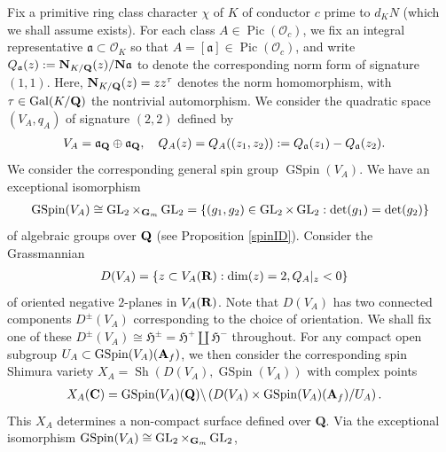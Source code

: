 \documentclass{amsart}
\theoremstyle{definition}
\begin{document}
Fix a primitive ring class character $\chi$ of $K$ of conductor $c$ prime to $d_KN$ (which we shall assume exists).
For each class $A \in \operatorname{Pic}(\mathcal{O}_c)$, we fix an integral representative
$\mathfrak{a} \subset \mathcal{O}_K$ so that $A = [\mathfrak{a}] \in \operatorname{Pic}(\mathcal{O}_c)$,
and write $Q_{\mathfrak{a}}(z) := {\bf{N}}_{K/{\bf{Q}}}(z)/{\bf{N}} \mathfrak{a}$ to denote the corresponding norm form of signature $(1,1)$.
Here, ${\bf{N}}_{K/{\bf{Q}}}(z) = z z^{\tau}$ denotes the norm homomorphism, with $\tau \in \operatorname{Gal}(K/{\bf{Q}})$ the nontrivial automorphism. 
We consider the quadratic space $(V_A, q_A)$ of signature $(2,2)$ defined by
\begin{align*}V_A &= \mathfrak{a}_{\bf{Q}} \oplus \mathfrak{a}_{\bf{Q}}, \quad
Q_A(z) = Q_A((z_1, z_2)) := Q_{\mathfrak{a}}(z_1) - Q_{\mathfrak{a}}(z_2). \end{align*} 
We consider the corresponding general spin group $\operatorname{GSpin}(V_A)$. We have an exceptional isomorphism 
\begin{align*} \operatorname{GSpin}(V_A) \cong \operatorname{GL}_2 \times_{{\bf{G}}_m} \operatorname{GL}_2
= \left\lbrace (g_1, g_2) \in \operatorname{GL}_2 \times \operatorname{GL}_2: \det(g_1) = \det(g_2) \right\rbrace \end{align*}
of algebraic groups over ${\bf{Q}}$ (see Proposition \ref{spinID}). Consider the Grassmannian 
\begin{align*} D(V_A) &= \left\lbrace z \subset V_A({\bf{R}}): \operatorname{dim}(z)=2, Q_A\vert_z <0 \right\rbrace \end{align*}
of oriented negative $2$-planes in $V_A(\bf{R})$. 
Note that $D(V_A)$ has two connected components $D^{\pm}(V_A)$ corresponding to the choice of orientation.
We shall fix one of these $D^{\pm}(V_A) \cong \mathfrak{H}^{\pm} = \mathfrak{H}^+ \coprod \mathfrak{H}^{-}$ throughout. 
For any compact open subgroup $U_A \subset \operatorname{GSpin}(V_A)({\bf{A}}_f)$, we then
consider the corresponding spin Shimura variety $X_A = \operatorname{Sh}(D(V_A), \operatorname{GSpin}(V_A))$ with complex points 
\begin{align*} X_A({\bf{C}}) &= \operatorname{GSpin}(V_A)({\bf{Q}}) \backslash \left( D(V_A) \times \operatorname{GSpin}(V_A) ( {\bf{A}}_f ) / U_A \right). \end{align*}
This $X_A$ determines a non-compact surface defined over {\bf{Q}}. 
Via the exceptional isomorphism $\operatorname{GSpin}(V_A) \cong  \operatorname{GL}_2 \times_{{\bf{G}}_m} \operatorname{GL}_2$, 
\end{document}
